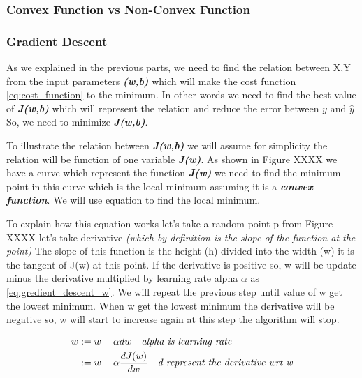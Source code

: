 \subsubsection{Convex Function vs Non-Convex Function }

\newpage
\subsubsection{Gradient Descent}

As we explained in the previous parts, we need to find the relation between X,Y from the input parameters \textbf{\textit{(w,b)}} which will make the cost function  \eqref{eq:cost_function} to the minimum. In other words we need to find the best value of \textbf{\textit{J(w,b)}} which will represent the relation and reduce the error between $y$ and $\widehat{y}$  So, we need to minimize \textbf{\textit{J(w,b)}}.  %

To illustrate the relation between \textbf{\textit{J(w,b)}} we will assume for simplicity the relation will be function of one variable \textbf{\textit{J(w)}}. As shown in Figure XXXX we have a curve which represent the function \textbf{\textit{J(w)}} we need to find the minimum point in this curve which is the local minimum assuming it is a  \textbf{\textit{convex function}}. We will use equation \label{eq:gredient_descent_w} to find the local minimum.

To explain how this equation works let's take a random point p from Figure XXXX let's take derivative \textit{(which by definition is the slope of the function at the point)} The slope of this function is the height (h) divided into the width (w) it is the tangent of J(w) at this point. If the derivative is positive so, w will be update minus the derivative multiplied by learning rate alpha $\alpha$ as \eqref{eq:gredient_descent_w}. We will repeat the previous step until value of w get the lowest minimum. When w get the lowest minimum the derivative will be negative so, w will start to increase again at this step the algorithm will stop.



\begin{equation}\label{eq:gredient_descent_w}
  \begin{split}
    w & := w - \alpha dw \quad \text{\textit{alpha is learning rate}}\\
      & := w - \alpha \frac{dJ(w)}{dw} \quad \text{\textit{d represent the derivative wrt w}}
  \end{split}
\end{equation}

